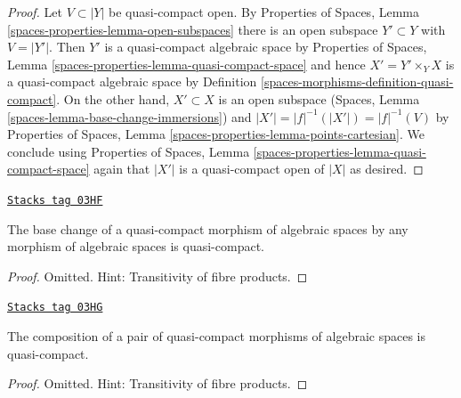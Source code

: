 \begin{proof}
Let $V \subset |Y|$ be quasi-compact open. By Properties of Spaces,
Lemma \ref{spaces-properties-lemma-open-subspaces}
there is an open subspace $Y' \subset Y$ with $V = |Y'|$.
Then $Y'$ is a quasi-compact algebraic space by
Properties of Spaces, Lemma \ref{spaces-properties-lemma-quasi-compact-space}
and hence $X' = Y' \times_Y X$ is a quasi-compact algebraic
space by Definition \ref{spaces-morphisms-definition-quasi-compact}.
On the other hand, $X' \subset X$ is an open subspace
(Spaces, Lemma \ref{spaces-lemma-base-change-immersions})
and $|X'| = |f|^{-1}(|X'|) = |f|^{-1}(V)$ by
Properties of Spaces, Lemma \ref{spaces-properties-lemma-points-cartesian}.
We conclude using
Properties of Spaces, Lemma \ref{spaces-properties-lemma-quasi-compact-space}
again that $|X'|$ is a quasi-compact open of $|X|$ as desired.
\end{proof}

\begin{lemma}
\label{spaces-morphisms-lemma-base-change-quasi-compact}
\href{https://stacks.math.columbia.edu/tag/03HF}{\texttt{Stacks tag 03HF}}

The base change of a quasi-compact morphism of algebraic spaces
by any morphism of algebraic spaces is quasi-compact.
\end{lemma}

\begin{proof}
Omitted. Hint: Transitivity of fibre products.
\end{proof}

\begin{lemma}
\label{spaces-morphisms-lemma-composition-quasi-compact}
\href{https://stacks.math.columbia.edu/tag/03HG}{\texttt{Stacks tag 03HG}}

The composition of a pair of quasi-compact morphisms of algebraic spaces
is quasi-compact.
\end{lemma}

\begin{proof}
Omitted. Hint: Transitivity of fibre products.
\end{proof}

